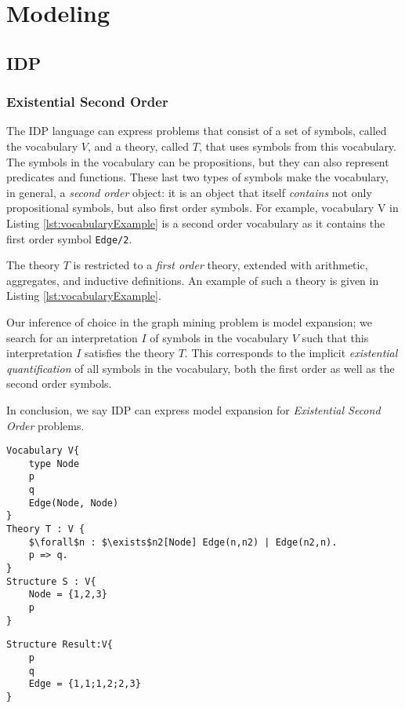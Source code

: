 \section{Modeling}
\subsection{IDP}
\subsubsection{Existential Second Order}
The IDP language can express problems that consist of a set of symbols, called the vocabulary $V$, and a theory, called $T$, that uses symbols from this vocabulary.
The symbols in the vocabulary can be propositions, but they can also represent predicates and functions.
These last two types of symbols make the vocabulary, in general, a \emph{second order} object: it is an object that itself \emph{contains} not only propositional symbols, but also first order symbols.
For example, vocabulary V in Listing \ref{lst:vocabularyExample} is a second order vocabulary as it contains the first order symbol \lstinline{Edge/2}.

The theory $T$ is restricted to a \emph{first order} theory, extended with arithmetic, aggregates, and inductive definitions.
An example of such a theory is given in Listing \ref{lst:vocabularyExample}.

Our inference of choice in the graph mining problem is model expansion; we search for an interpretation $I$ of symbols in the vocabulary $V$ such that this interpretation $I$ satisfies the theory $T$.
This corresponds to the implicit \emph{existential quantification} of all symbols in the vocabulary, both the first order as well as the second order symbols.

In conclusion, we say IDP can express model expansion for \emph{Existential Second Order} problems.

\begin{lstlisting}[mathescape,basicstyle=\fontfamily{lmvtt}\selectfont,caption=\ldots, label=lst:vocabularyExample]
Vocabulary V{
    type Node
    p
    q
    Edge(Node, Node)
}
Theory T : V {
    $\forall$n : $\exists$n2[Node] Edge(n,n2) | Edge(n2,n).
    p => q.
}
Structure S : V{
    Node = {1,2,3}
    p
}
\end{lstlisting}
\begin{lstlisting}
Structure Result:V{
    p
    q
    Edge = {1,1;1,2;2,3}
}
\end{lstlisting}


